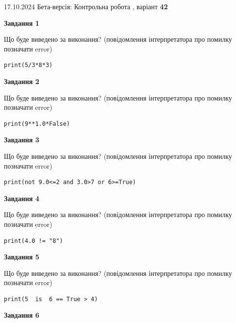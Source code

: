 \documentclass[12pt, ukrainian]{article}
\begin{document}
{\Large{17.10.2024 Бета-версія: Контрольна робота , варіант  \No \textbf { 42 }\par}}
{
\begin {large}
{\begin {center}\textbf{Завдання 1}\end {center}}

Що буде виведено за виконання? (повідомлення інтерпретатора про помилку позначати error)\par
\begin{verbatim}
print(5/3*8*3)
\end{verbatim}

{\begin {center}\textbf{Завдання 2}\end {center}}

Що буде виведено за виконання? (повідомлення інтерпретатора про помилку позначати error)\par
\begin{verbatim}
print(9**1.0*False)
\end{verbatim}

{\begin {center}\textbf{Завдання 3}\end {center}}

Що буде виведено за виконання? (повідомлення інтерпретатора про помилку позначати error)\par
\begin{verbatim}
print(not 9.0<=2 and 3.0>7 or 6>=True)
\end{verbatim}

{\begin {center}\textbf{Завдання 4}\end {center}}

Що буде виведено за виконання? (повідомлення інтерпретатора про помилку позначати error)\par
\begin{verbatim}
print(4.0 != "8")
\end{verbatim}

{\begin {center}\textbf{Завдання 5}\end {center}}

Що буде виведено за виконання? (повідомлення інтерпретатора про помилку позначати error)\par
\begin{verbatim}
print(5  is  6 == True > 4)
\end{verbatim}

{\begin {center}\textbf{Завдання 6}\end {center}}


\end{large}}
\end{document}

